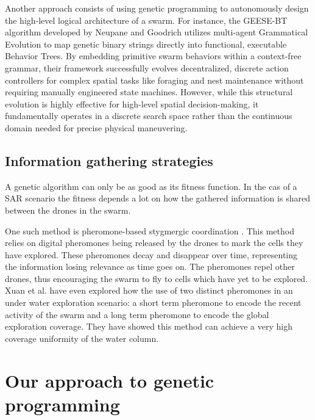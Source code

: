 \documentclass[conference]{IEEEtran}
\begin{document}
Another approach consists of using genetic programming to autonomously design the high-level logical architecture of a swarm. For instance, the GEESE-BT algorithm developed by Neupane and Goodrich \cite{neupane_learning_2019} utilizes multi-agent Grammatical Evolution to map genetic binary strings directly into functional, executable Behavior Trees. By embedding primitive swarm behaviors within a context-free grammar, their framework successfully evolves decentralized, discrete action controllers for complex spatial tasks like foraging and nest maintenance without requiring manually engineered state machines. However, while this structural evolution is highly effective for high-level spatial decision-making, it fundamentally operates in a discrete search space rather than the continuous domain needed for precise physical maneuvering.

\subsection{Information gathering strategies}

A genetic algorithm can only be as good as its fitness function. In the cas of a SAR scenario the fitness depends a lot on how the gathered information is shared between the drones in the swarm. 

One such method is pheromone-based stygmergic coordination \cite{devaraju_connectivity-aware_2023, xuan_dual-trail_2026}. This method relies on digital pheromones being released by the drones to mark the cells they have explored. These pheromones decay and disappear over time, representing the information losing relevance as time goes on. The pheromones repel other drones, thus encouraging the swarm to fly to cells which have yet to be explored. Xuan et al. \cite{xuan_dual-trail_2026} have even explored how the use of two distinct pheromones in an under water exploration scenario: a short term pheromone to encode the recent activity of the swarm and a long term pheromone to encode the global exploration coverage. They have showed this method can achieve a very high coverage uniformity of the water column. 

\section{Our approach to genetic programming}
\label{GP}
\end{document}
